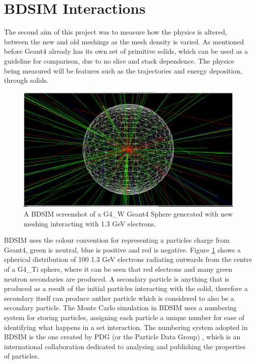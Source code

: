 \documentclass[12pt,a4paper]{article}
\begin{document}

\section{BDSIM Interactions}
\label{int}
The second aim of this project was to measure how the physics is altered, between the new and old meshings as the mesh density is varied. As mentioned before Geant4 already has its own set of primitive solids, which can be used as a guideline for comparison, due to no slice and stack dependence. The physics being measured will be features such as the trajectories and energy deposition, through solids.

\begin{figure}[h!]
\centering
\includegraphics[scale=0.33]{Images//BDSIM//titanium.pdf}
\caption[width=\columnwidth]{A BDSIM screenshot of a G4\_W Geant4 Sphere generated with new meshing interacting with 1.3 GeV electrons.}
\label{black}
\end{figure}

\noindent BDSIM uses the colour convention for representing a particles charge from Geant4, green is neutral, blue is positive and red is negative. Figure \ref{black} shows a spherical distribution of 100 1.3 GeV electrons radiating outwards from the centre of a G4\_Ti sphere, where it can be seen that red electrons and many green neutron secondaries are produced. A secondary particle is anything that is produced as a result of the initial particles interacting with the solid, therefore a secondary itself can produce anther particle which is considered to also be  a secondary particle. The Monte Carlo simulation in BDSIM uses a numbering system for storing particles, assigning each particle a unique number for ease of identifying what happens in a set interaction. The numbering system adopted in BDSIM is the one created by PDG (or the Particle Data Group) \cite{pdg}, which is an international collaboration dedicated to analysing and publishing the properties of particles. 
\end{document}
